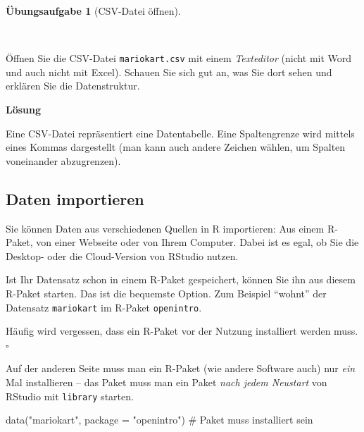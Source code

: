 \documentclass[
  letterpaper,
  twoside,
  open=any]{scrbook}
\newenvironment{Shaded}{\begin{snugshade}}{\end{snugshade}}
\newcommand{\AttributeTok}[1]{\textcolor[rgb]{0.40,0.45,0.13}{#1}}
\newcommand{\CommentTok}[1]{\textcolor[rgb]{0.37,0.37,0.37}{#1}}
\newcommand{\FunctionTok}[1]{\textcolor[rgb]{0.28,0.35,0.67}{#1}}
\newcommand{\NormalTok}[1]{\textcolor[rgb]{0.00,0.23,0.31}{#1}}
\newcommand{\StringTok}[1]{\textcolor[rgb]{0.13,0.47,0.30}{#1}}
\theoremstyle{definition}
\newtheorem{exercise}{Übungsaufgabe}[chapter]
\theoremstyle{definition}
\theoremstyle{definition}
\theoremstyle{remark}
\begin{document}
\begin{exercise}[CSV-Datei
öffnen]\protect\hypertarget{exr-csv}{}\label{exr-csv}

~

Öffnen Sie die CSV-Datei \texttt{mariokart.csv} mit einem
\emph{Texteditor} (nicht mit Word und auch nicht mit Excel). Schauen Sie
sich gut an, was Sie dort sehen und erklären Sie die Datenstruktur.

\textbf{Lösung}

Eine CSV-Datei repräsentiert eine Datentabelle. Eine Spaltengrenze wird
mittels eines Kommas dargestellt (man kann auch andere Zeichen wählen,
um Spalten voneinander abzugrenzen).

\end{exercise}

\subsection{Daten importieren}\label{sec-import-mariokart}

Sie können Daten aus verschiedenen Quellen in R importieren: Aus einem
R-Paket, von einer Webseite oder von Ihrem Computer. Dabei ist es egal,
ob Sie die Desktop- oder die Cloud-Version von RStudio nutzen.

Ist Ihr Datensatz schon in einem R-Paket gespeichert, können Sie ihn aus
diesem R-Paket starten. Das ist die bequemste Option. Zum Beispiel
\enquote{wohnt} der Datensatz \texttt{mariokart} im R-Paket
\texttt{openintro}.

\begin{tcolorbox}[enhanced jigsaw, colframe=quarto-callout-tip-color-frame, arc=.35mm, leftrule=.75mm, bottomtitle=1mm, titlerule=0mm, colbacktitle=quarto-callout-tip-color!10!white, breakable, bottomrule=.15mm, colback=white, left=2mm, rightrule=.15mm, opacityback=0, toptitle=1mm, toprule=.15mm, opacitybacktitle=0.6, title=\textcolor{quarto-callout-tip-color}{\faLightbulb}\hspace{0.5em}{Tipp}, coltitle=black]

Häufig wird vergessen, dass ein R-Paket vor der Nutzung installiert
werden muss. \(\square\)

\end{tcolorbox}

Auf der anderen Seite muss man ein R-Paket (wie andere Software auch)
nur \emph{ein} Mal installieren -- das Paket muss man ein Paket
\emph{nach jedem Neustart} von RStudio mit \texttt{library} starten.

\begin{Shaded}
\begin{Highlighting}[]
\FunctionTok{data}\NormalTok{(}\StringTok{"mariokart"}\NormalTok{, }\AttributeTok{package =} \StringTok{"openintro"}\NormalTok{) }\CommentTok{\# Paket muss installiert sein}
\end{Highlighting}
\end{Shaded}
\end{document}

